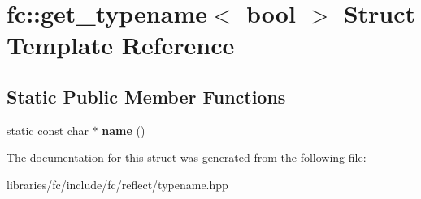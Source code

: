 \hypertarget{structfc_1_1get__typename_3_01bool_01_4}{}\section{fc\+:\+:get\+\_\+typename$<$ bool $>$ Struct Template Reference}
\label{structfc_1_1get__typename_3_01bool_01_4}
\subsection*{Static Public Member Functions}
\begin{DoxyCompactItemize}
\item 
\mbox{\label{structfc_1_1get__typename_3_01bool_01_4_abb0d9f0d5e4b4500d93491bbf05386b9}} 
static const char $\ast$ {\bfseries name} ()
\end{DoxyCompactItemize}


The documentation for this struct was generated from the following file\+:\begin{DoxyCompactItemize}
\item 
libraries/fc/include/fc/reflect/typename.\+hpp\end{DoxyCompactItemize}
